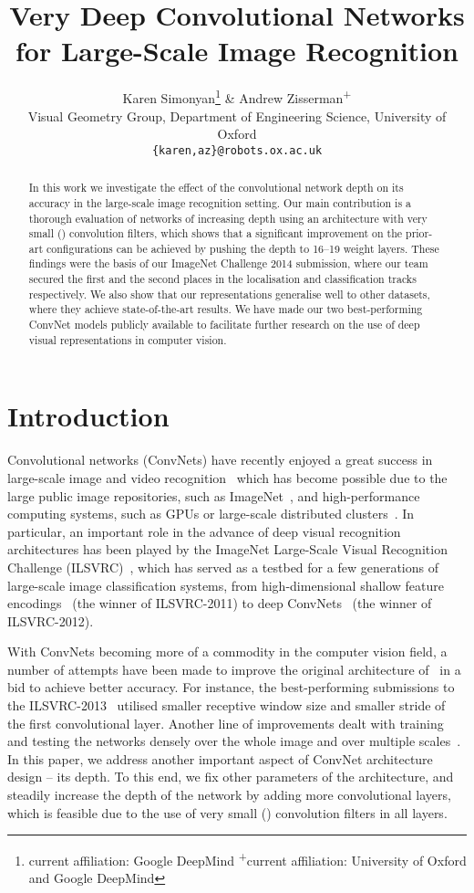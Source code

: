 \documentclass{article} \usepackage{iclr2015,times}
\title{Very Deep Convolutional Networks \\ for Large-Scale Image Recognition}
\author{
Karen Simonyan\thanks{current affiliation: Google DeepMind \; \textsuperscript{+}current affiliation: University of Oxford and Google DeepMind} \;
\& Andrew Zisserman\textsuperscript{+} \\
Visual Geometry Group, Department of Engineering Science, University of Oxford\\
\texttt{\{karen,az\}@robots.ox.ac.uk}  
}
\begin{document}
\maketitle

\begin{abstract}
In this work we investigate the effect of the convolutional network depth on its accuracy in the large-scale image recognition setting.
Our main contribution is a thorough evaluation of networks of increasing depth using an architecture with very small () convolution filters,
which shows that a significant improvement on the prior-art configurations can be achieved by pushing the depth to 16--19 weight layers. 
These findings were the basis of our \mbox{ImageNet} \mbox{Challenge} 2014 submission, where our team secured the first and the second places in the localisation and classification tracks
respectively. 
We also show that our representations generalise well to other datasets, where they achieve state-of-the-art results.
We have made our two best-performing ConvNet models publicly available to facilitate further research on the use of deep visual representations in computer vision.
\end{abstract}

\section{Introduction}
Convolutional networks (ConvNets) have recently enjoyed a great success in large-scale image and video recognition~\citep{Krizhevsky12,Zeiler13,Sermanet14,Simonyan14b}
which has become possible due to the large public image repositories, such as ImageNet~\citep{Deng09}, and high-performance computing systems, such as GPUs or large-scale distributed clusters~\citep{Dean12}.
In particular, an important role in the advance of deep visual recognition architectures has been played by the ImageNet Large-Scale Visual Recognition Challenge (ILSVRC)~\citep{Russakovsky14},
which has served as a testbed for a few generations of large-scale image classification systems, from high-dimensional shallow feature encodings~\citep{Perronnin10a} (the winner of ILSVRC-2011)
to deep ConvNets~\citep{Krizhevsky12} (the winner of ILSVRC-2012).

With ConvNets becoming more of a commodity in the computer vision field, a number of attempts have been made to improve the original architecture of~\citet{Krizhevsky12} in a bid to achieve
better accuracy. For instance, the best-performing submissions to the ILSVRC-2013~\citep{Zeiler13,Sermanet14} utilised smaller receptive window size and smaller stride of the first convolutional
layer. Another line of improvements dealt with training and testing the networks densely over the whole image and over multiple scales~\citep{Sermanet14,Howard14}.
In this paper, we address another important aspect of ConvNet architecture design -- its depth. 
To this end, we fix other parameters of the architecture, and steadily increase the depth of the network by adding more convolutional layers, which is feasible due to the use of very small () convolution filters in all layers.
\end{document}
